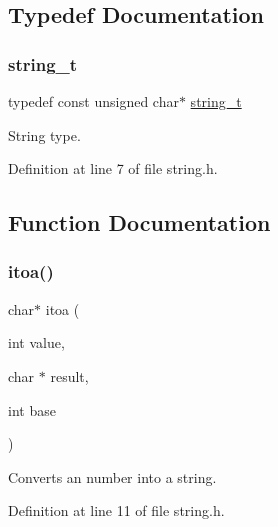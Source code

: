 \subsection{Typedef Documentation}
\mbox{\label{a00029_ada436671bc57dfd805a9f3974c81e618_ada436671bc57dfd805a9f3974c81e618}} 
\subsubsection{\texorpdfstring{string\+\_\+t}{string\_t}}
{\footnotesize\ttfamily typedef const unsigned char$\ast$ \hyperlink{a00029_ada436671bc57dfd805a9f3974c81e618_ada436671bc57dfd805a9f3974c81e618}{string\+\_\+t}}



String type. 



Definition at line 7 of file string.\+h.



\subsection{Function Documentation}
\mbox{\label{a00029_a22e98a8cf2e2c79d738830b387cace28_a22e98a8cf2e2c79d738830b387cace28}} 
\subsubsection{\texorpdfstring{itoa()}{itoa()}}
{\footnotesize\ttfamily char$\ast$ itoa (\begin{DoxyParamCaption}\item[{int}]{value,  }\item[{char $\ast$}]{result,  }\item[{int}]{base }\end{DoxyParamCaption})}



Converts an number into a string. 



Definition at line 11 of file string.\+h.

\mbox{\label{a00029_a013b85760fd6ecea52a8c8fdd8cf87c9_a013b85760fd6ecea52a8c8fdd8cf87c9}} 
